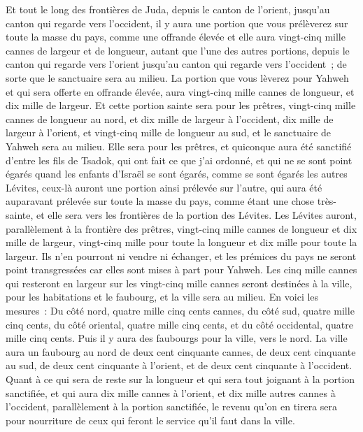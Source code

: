 \begin{multicols}{2}
Et tout le long des frontières de Juda, depuis le canton de l'orient, jusqu'au canton qui regarde vers l'occident, il y aura une portion que vous prélèverez sur toute la masse du pays, comme une offrande élevée et elle aura vingt-cinq mille cannes de largeur et de longueur, autant que l'une des autres portions, depuis le canton qui regarde vers l'orient jusqu'au canton qui regarde vers l'occident~; de sorte que le sanctuaire sera au milieu.
La portion que vous lèverez pour Yahweh et qui sera offerte en offrande élevée, aura vingt-cinq mille cannes de longueur, et dix mille de largeur.
Et cette portion sainte sera pour les prêtres, vingt-cinq mille cannes de longueur au nord, et dix mille de largeur à l'occident, dix mille de largeur à l'orient, et vingt-cinq mille de longueur au sud, et le sanctuaire de Yahweh sera au milieu.
Elle sera pour les prêtres, et quiconque aura été sanctifié d'entre les fils de Tsadok, qui ont fait ce que j'ai ordonné, et qui ne se sont point égarés quand les enfants d'Israël se sont égarés, comme se sont égarés les autres Lévites,
ceux-là auront une portion ainsi prélevée sur l'autre, qui aura été auparavant prélevée sur toute la masse du pays, comme étant une chose très-sainte, et elle sera vers les frontières de la portion des Lévites.
Les Lévites auront, parallèlement à la frontière des prêtres, vingt-cinq mille cannes de longueur et dix mille de largeur, vingt-cinq mille pour toute la longueur et dix mille pour toute la largeur.
Ils n'en pourront ni vendre ni échanger, et les prémices du pays ne seront point transgressées car elles sont mises à part pour Yahweh.
Les cinq mille cannes qui resteront en largeur sur les vingt-cinq mille cannes seront destinées à la ville, pour les habitations et le faubourg, et la ville sera au milieu.
En voici les mesures~: Du côté nord, quatre mille cinq cents cannes, du côté sud, quatre mille cinq cents, du côté oriental, quatre mille cinq cents, et du côté occidental, quatre mille cinq cents.
Puis il y aura des faubourgs pour la ville, vers le nord. La ville aura un faubourg au nord de deux cent cinquante cannes, de deux cent cinquante au sud, de deux cent cinquante à l'orient, et de deux cent cinquante à l'occident.
Quant à ce qui sera de reste sur la longueur et qui sera tout joignant à la portion sanctifiée, et qui aura dix mille cannes à l'orient, et dix mille autres cannes à l'occident, parallèlement à la portion sanctifiée, le revenu qu'on en tirera sera pour nourriture de ceux qui feront le service qu'il faut dans la ville.

\end{multicols}
